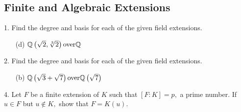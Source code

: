 \subsection{Finite and Algebraic Extensions}
\begin{mdframed}[style=darkQuesion]
  1. Find the degree and basis for each of the given field extensions. 
  \begin{itemize}
    \item[(d)]{$\mathbb{Q}\left(\sqrt{2},\sqrt[3]{2}\right) \text{over} \mathbb{Q}$}
  \end{itemize}
\end{mdframed}
\begin{mdframed}[style=darkAnswer,frametitle={Joe Starr}]
\end{mdframed}
\newpage
\begin{mdframed}[style=darkQuesion]
  2. Find the degree and basis for each of the given field extensions. 
  \begin{itemize}
    \item[(b)]{$\mathbb{Q}\left(\sqrt{3}+\sqrt{7}\right) \text{over} \mathbb{Q}\left(\sqrt{7}\right)$}
  \end{itemize}
\end{mdframed}
\begin{mdframed}[style=darkAnswer,frametitle={Joe Starr}]
\end{mdframed}
\newpage
\begin{mdframed}[style=darkQuesion]
  4. Let $F$ be a finite extension of $K$ such that $[F: K]=p,$ a prime number. If $u \in F$ but $u \notin K,$ show that $F=K(u)$.
\end{mdframed}
